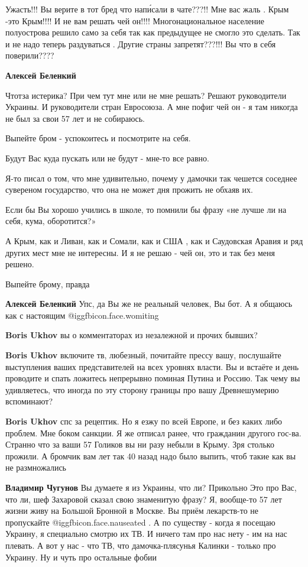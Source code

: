 \begin{itemize}
\begin{itemize}
Ужасть!!! Вы верите в тот бред что напи́сали в чате???!! Мне вас жаль . Крым
-это Крым!!!! И не вам решать чей он!!!! Многонациональное население
полуострова решило само за себя так как предыдущее не смогло это сделать. Так и
не надо теперь раздуваться . Другие страны запретят???!!! Вы что в себя
поверили????

\textbf{Алексей Беленкий} 

Чтотза истерика? При чем тут мне или не мне решать? Решают руководители
Украины. И руководители стран Евросоюза. А мне пофиг чей он - я там никогда не
был за свои 57 лет и не собираюсь.

Выпейте бром - успокоитесь и посмотрите на себя.

Будут Вас куда пускать или не будут - мне-то все равно.

Я-то писал о том, что мне удивительно, почему у дамочки так чешется соседнее
сувереном государство, что она не может дня прожить не обхаяв их.

Если бы Вы хорошо учились в школе, то помнили бы фразу «не лучше ли на себя,
кума, оборотится?»

А Крым, как и Ливан, как и Сомали, как и США , как и Саудовская Аравия и ряд
других мест мне не интересны. И я не решаю - чей он, это и так без меня решено.

Выпейте брому, правда

\textbf{Алексей Беленкий} Упс, да Вы же не реальный человек, Вы бот. А я общаюсь как с настоящим @igg{fbicon.face.womiting} 

\textbf{Boris Ukhov} вы о комментаторах из незалежной и прочих бывших?

\textbf{Boris Ukhov} включите тв, любезный, почитайте прессу вашу, послушайте выступления ваших представителей на всех уровнях власти. Вы и встаёте и день проводите и спать ложитесь непрерывно поминая Путина и Россию. Так чему вы удивляетесь, что иногда по эту сторону границы про вашу Древнешумерию вспоминают?

\textbf{Boris Ukhov} спс за рецептик. Но я езжу по всей Европе, и без каких либо проблем. Мне боком санкции. Я же отписал ранее, что гражданин другого гос-ва. Странно что за ваши 57 Голиков вы ни разу небыли в Крыму. Зря столько прожили. А бромчик вам лет так 40 назад надо было выпить, чтоб такие как вы не размножались

\textbf{Владимир Чугунов} Вы думаете я из Украины, что ли?
Прикольно
Это про Вас, что ли, шеф Захаровой сказал свою знаменитую фразу?
Я, вообще-то 57 лет жизни живу на Большой Бронной в Москве.
Вы приём лекарств-то не пропускайте @igg{fbicon.face.nauseated} .
А по существу - когда я посещаю Украину, я специально смотрю их ТВ. И ничего там про нас нету - им на нас плевать. А вот у нас - что ТВ, что дамочка-плясунья Калинки - только про Украину. Ну и чуть про остальные фобии


\end{itemize}
\end{itemize}
